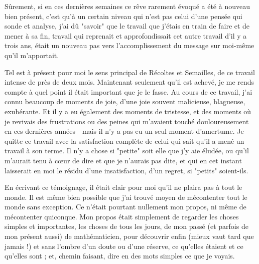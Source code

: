 Sûrement, si en ces dernières semaines ce rêve rarement évoqué a été à nouveau bien présent, c'est qu'à un certain niveau qui n'est pas celui d'une pensée qui sonde et analyse, j'ai dû "savoir" que le travail que j'étais en train de faire et de mener à sa fin, travail qui reprenait et approfondissait cet autre travail d'il y a trois ans, était un nouveau pas vers l'accomplissement du message sur moi-même qu'il m'apportait.

Tel est à présent pour moi le sens principal de Récoltes et Semailles, de ce travail intense de près de deux mois. Maintenant seulement qu'il est achevé, je me rends compte à quel point il était important que je le fasse. Au cours de ce travail, j'ai connu beaucoup de moments de joie, d'une joie souvent malicieuse, blagueuse, exubérante. Et il y a eu également des moments de tristesse, et des moments où je revivais des frustrations ou des peines qui m'avaient touché douloureusement en ces dernières années - mais il n'y a pas eu un seul moment d'amertume. Je quitte ce travail avec la satisfaction complète de celui qui sait qu'il a mené un travail à son terme. Il n'y a chose si "petite" soit elle que j'y aie éludée, ou qu'il m'aurait tenu à cœur de dire et que je n'aurais pas dite, et qui en cet instant laisserait en moi le résidu d'une insatisfaction, d'un regret, si "petits" soient-ils.

En écrivant ce témoignage, il était clair pour moi qu'il ne plaira pas à tout le monde. Il est même bien possible que j'ai trouvé moyen de mécontenter tout le monde sans exception. Ce n'était pourtant nullement mon propos, ni même de mécontenter quiconque. Mon propos était simplement de regarder les choses simples et importantes, les choses de tous les jours, de mon passé (et parfois de mon présent aussi) de mathématicien, pour découvrir enfin (mieux vaut tard que jamais !) et sans l'ombre d'un doute ou d'une réserve, ce qu'elles étaient et ce qu'elles sont ; et, chemin faisant, dire en des mots simples ce que je voyais.

